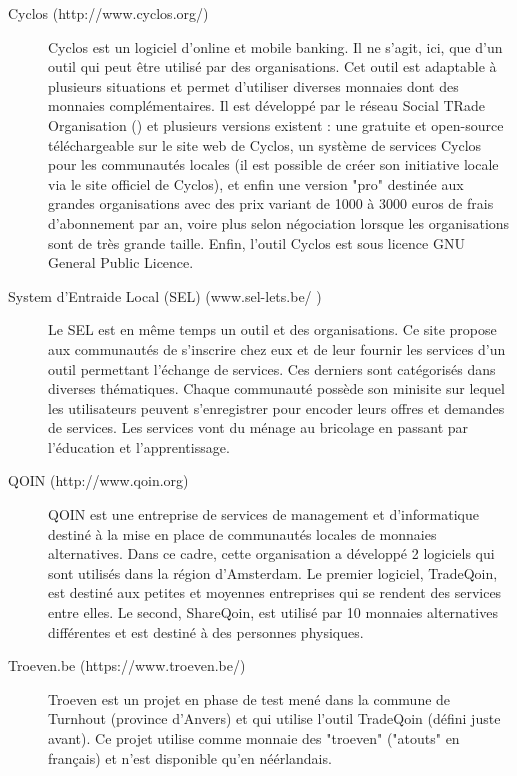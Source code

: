 \begin{description}

\item [Cyclos (http://www.cyclos.org/)]

Cyclos est un logiciel d'online et mobile banking.  Il ne s'agit,  ici,  que d'un outil qui peut être utilisé par des organisations.  Cet outil est adaptable à plusieurs situations et permet d'utiliser diverses monnaies dont des monnaies complémentaires.  Il est développé par le réseau Social TRade Organisation (\cite{STRO}) et plusieurs versions existent : une gratuite et open-source téléchargeable sur le site web de Cyclos,  un système de services Cyclos pour les communautés locales (il est possible de créer son initiative locale via le site officiel de Cyclos),  et enfin une version "pro" destinée aux grandes organisations avec des prix variant de 1000 à 3000 euros de frais d'abonnement par an,  voire plus selon négociation lorsque les organisations sont de très grande taille.  
Enfin,  l'outil Cyclos est sous licence GNU General Public Licence.

\item [System d'Entraide Local (SEL) (www.sel-lets.be/ )]

Le SEL est en même temps un outil et des organisations.  Ce site propose aux communautés de s'inscrire chez eux et de leur fournir les services d'un outil permettant l'échange de services.  Ces derniers sont catégorisés dans diverses thématiques.  Chaque communauté possède son minisite sur lequel les utilisateurs peuvent s'enregistrer pour encoder leurs offres et demandes de services.  Les services vont du ménage au bricolage en passant par l'éducation et l'apprentissage.  

\item [QOIN (http://www.qoin.org)]
\label{QOIN}

QOIN est une entreprise de services de management et d'informatique destiné à la mise en place de communautés locales de monnaies alternatives.  Dans ce cadre,  cette organisation a développé 2 logiciels qui sont utilisés dans la région d'Amsterdam.  Le premier logiciel,  TradeQoin,  est destiné aux petites et moyennes entreprises qui se rendent des services entre elles.  Le second,  ShareQoin,  est utilisé par 10 monnaies alternatives différentes et est destiné à des personnes physiques.  

\item [Troeven.be (https://www.troeven.be/)]
Troeven est un projet en phase de test mené dans la commune de Turnhout (province d'Anvers) et qui utilise l'outil TradeQoin (défini juste avant).  Ce projet utilise comme monnaie des "troeven" ("atouts" en français) et n'est disponible qu'en néérlandais.

\end{description}

